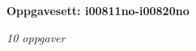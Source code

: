 \centerline{\bf Oppgavesett: i00811no-i00820no}
\vskip 10pt
\centerline{\it 10 oppgaver}\vskip 10pt
\vskip 10pt
